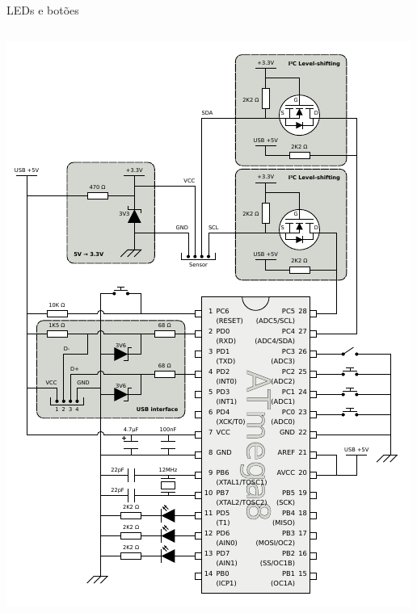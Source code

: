 \documentclass{beamer}
\begin{document}
\begin{frame}{LEDs e botões}
	\begin{columns}
		\begin{center}
			\includegraphics[keepaspectratio, width=1.0\textwidth, height=0.8\textheight, clip, viewport=0.66in 0.10in 2.00in 1.66in]{../monografia/img/AVR-magnetometer-usb-mouse.pdf}
		\end{center}


\end{columns}
\end{frame}
\end{document}
